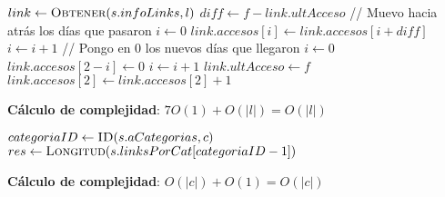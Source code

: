 \documentclass[10pt, a4paper]{article}
\let\TipoVariable=\texttt
\let\ModificadorArgumento=\textbf
\newcommand{\In}[2]{\ModificadorArgumento{in} \ensuremath{#1}\,: \TipoVariable{#2}\xspace}
\newcommand{\Inout}[2]{\ModificadorArgumento{in/out} \ensuremath{#1}\,: \TipoVariable{#2}\xspace}
\newcommand{\DRef}{\ensuremath{\rightarrow}}
\begin{document}
\begin{algorithm}[H]
\caption*{iAccederLink(\Inout{s}{LinkLinkIt}, \In{l}{link}, \In{f}{fecha})}
\begin{algorithmic}[1]
	\State $link \gets \Call{Obtener}{s.infoLinks, l}$
    \State $diff \gets f - link.ultAcceso$
    \Statex
    \Statex // Muevo hacia atr\'as los d\'ias que pasaron
    \State $i \gets 0$
        \State $link.accesos[i] \gets link.accesos[i + diff]$
        \State $i \gets i + 1$
    \EndWhile
    \Statex
    \Statex // Pongo en 0 los nuevos d\'ias que llegaron
    \State $i \gets 0$
        \State $link.accesos[2 - i] \gets 0$
        \State $i \gets i + 1$
    \EndWhile
    \Statex
    \State $link.ultAcceso \gets f$
    \State $link.accesos[2] \gets link.accesos[2] + 1$
\end{algorithmic}
\textbf{C\'alculo de complejidad}: $7O(1) + O(|l|) = O(|l|)$
\end{algorithm}

\begin{algorithm}[H]
\caption*{iCantLinks(\In{s}{LinkLinkIt}, \In{c}{categoria}) $\DRef res$ : \TipoVariable{Nat}}
\begin{algorithmic}[1]
	\State $categoriaID \gets \Call{ID}{s.aCategorias, c}$
	\State $res \gets \Call{Longitud}{s.linksPorCat[categoriaID-1]}$
\end{algorithmic}
\textbf{C\'alculo de complejidad}: $O(|c|) + O(1) = O(|c|)$
\end{algorithm}
\end{document}

